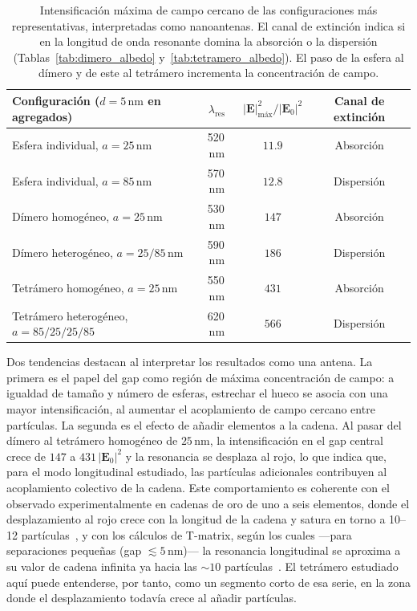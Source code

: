 \begin{table}[H]
  \centering
  \begin{tabular}{lccc}
    \hline
    Configuración ($d=5\,\text{nm}$ en agregados) & $\lambda_\text{res}$ &
    $|\mathbf{E}|^2_\text{máx}/|\mathbf{E}_0|^2$ & Canal de extinción \\
    \hline
    Esfera individual, $a=25\,\text{nm}$        & 520\,nm & $11.9$  & Absorción \\
    Esfera individual, $a=85\,\text{nm}$        & 570\,nm & $12.8$  & Dispersión \\
    Dímero homogéneo, $a=25\,\text{nm}$         & 530\,nm & $147$   & Absorción \\
    Dímero heterogéneo, $a=25/85\,\text{nm}$    & 590\,nm & $186$   & Dispersión \\
    Tetrámero homogéneo, $a=25\,\text{nm}$      & 550\,nm & $431$   & Absorción \\
    Tetrámero heterogéneo, $a=85/25/25/85$      & 620\,nm & $566$   & Dispersión \\
    \hline
  \end{tabular}
  \caption{Intensificación máxima de campo cercano de las configuraciones
           más representativas, interpretadas como nanoantenas. El canal de
           extinción indica si en la longitud de onda resonante domina la
           absorción o la dispersión
           (Tablas~\ref{tab:dimero_albedo} y~\ref{tab:tetramero_albedo}). El
           paso de la esfera al dímero y de este al tetrámero incrementa la
           concentración de campo.}
  \label{tab:antena_merito}
\end{table}

Dos tendencias destacan al interpretar los resultados como una antena. La primera
es el papel del gap como región de máxima concentración de campo: a igualdad
de tamaño y número de esferas, estrechar el hueco se asocia con una mayor
intensificación, al aumentar el acoplamiento de campo cercano entre
partículas. La segunda es el efecto de añadir elementos a la cadena. Al pasar
del dímero al tetrámero homogéneo de $25\,\text{nm}$, la intensificación en el
gap central crece de $147$ a $431\,|\mathbf{E}_0|^2$ y la resonancia se
desplaza al rojo, lo que indica que, para el modo longitudinal estudiado, las
partículas adicionales contribuyen al acoplamiento colectivo de la cadena.
Este comportamiento es coherente con el observado experimentalmente en
cadenas de oro de uno a seis elementos, donde el desplazamiento al rojo crece
con la longitud de la cadena y satura en torno a 10--12
partículas~\cite{Barrow2011}, y con los cálculos de T-matrix, según los cuales
—para separaciones pequeñas (gap $\lesssim 5\,\text{nm}$)— la resonancia
longitudinal se aproxima a su valor de cadena infinita ya hacia las $\sim\!10$
partículas~\cite{Harris2009}. El tetrámero estudiado aquí puede entenderse,
por tanto, como un segmento corto de esa serie, en la zona donde el
desplazamiento todavía crece al añadir partículas.

